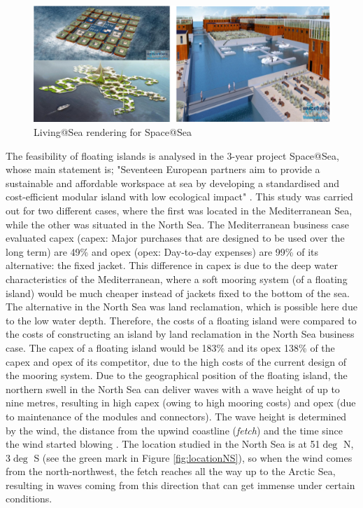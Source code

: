 \begin{figure}[h]
    \centering
    \includegraphics[width=\linewidth]{figures/Literature_Introduction/space@sea_renders.PNG}
    \caption{Living@Sea rendering for Space@Sea \citep{businessCase_S@S_D1.1}}
    \label{fig:my_label}
\end{figure}

The feasibility of floating islands is analysed in the 3-year project Space@Sea, whose main statement is; "Seventeen European partners aim to provide a sustainable and affordable workspace at sea by developing a standardised and cost-efficient modular island with low ecological impact" \citep{businessCase_S@S_D1.1}. This study was carried out for two different cases, where the first was located in the Mediterranean Sea, while the other was situated in the North Sea. The Mediterranean business case evaluated \acrshort{capex} (\acrlong{capex}: Major purchases that are designed to be used over the long term) are 49\% and \acrshort{opex} (\acrlong{opex}: Day-to-day expenses) are 99\% of its alternative: the fixed jacket. This difference in \acrshort{capex} is due to the deep water characteristics of the Mediterranean, where a soft mooring system (of a floating island) would be much cheaper instead of jackets fixed to the bottom of the sea. The alternative in the North Sea was land reclamation, which is possible here due to the low water depth. Therefore, the costs of a floating island were compared to the costs of constructing an island by land reclamation in the North Sea business case. The \acrshort{capex} of a floating island would be 183\% and its \acrshort{opex} 138\% of the \acrshort{capex} and \acrshort{opex} of its competitor, due to the high costs of the current design of the mooring system. Due to the geographical position of the floating island, the northern swell in the North Sea can deliver waves with a wave height of up to nine metres, resulting in high \acrshort{capex} (owing to high mooring costs) and \acrshort{opex} (due to maintenance of the modules and connectors). The wave height is determined by the wind, the distance from the upwind coastline (\textit{fetch}) and the time since the wind started blowing \citep{Holthuijsen2007}. The location studied in the North Sea is at 51$\deg$ N, 3$\deg$ S (see the green mark in Figure \ref{fig:locationNS}), so when the wind comes from the north-northwest, the fetch reaches all the way up to the Arctic Sea, resulting in waves coming from this direction that can get immense under certain conditions.

